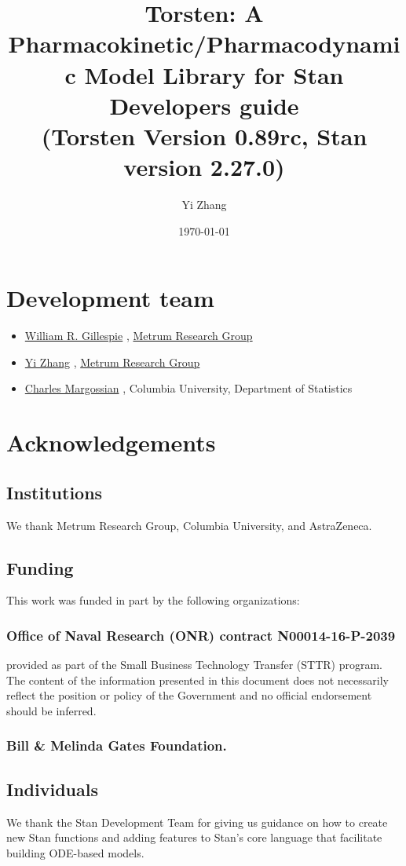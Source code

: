 \documentclass[12pt, reqno, oneside]{amsbook}
\author{Yi Zhang}
\date{\today}
\title{Torsten: A Pharmacokinetic/Pharmacodynamic Model Library for Stan\\\medskip
\large Developers guide \\  (Torsten Version 0.89rc, Stan version 2.27.0)}
\numberwithin{equation}{chapter}
\numberwithin{figure}{chapter}
\numberwithin{table}{chapter}
\theoremstyle{remark}
\begin{document}
\maketitle
\tableofcontents


\chapter*{Development team}
\label{sec:orge12504c}
\begin{itemize}
\item \href{mailto:billg@metrumrg.com}{William R. Gillespie} , \href{https://www.metrumrg.com/}{Metrum Research Group}
\item \href{mailto:yiz@metrumrg.com}{Yi Zhang} , \href{https://www.metrumrg.com/}{Metrum Research Group}
\item \href{mailto:charles.margossian@columbia.edu}{Charles Margossian} , Columbia University, Department of Statistics
\end{itemize}
\chapter*{Acknowledgements}
\label{sec:orgbe77a2c}
\section*{Institutions}
\label{sec:org91ecd8e}
We thank Metrum Research Group, Columbia University, and AstraZeneca.
\section*{Funding}
\label{sec:org341191d}
This work was funded in part by the following organizations:
\subsection*{Office of Naval Research (ONR) contract N00014-16-P-2039}
\label{sec:org4e6ff4c}
provided as part of the Small Business Technology Transfer (STTR)
program. The content of the information presented in this document
does not necessarily reflect the position or policy of the
Government and no official endorsement should be inferred.
\subsection*{Bill \& Melinda Gates Foundation.}
\label{sec:org76e5e40}
\section*{Individuals}
\label{sec:orgb90998b}
We thank the Stan Development Team for giving us guidance on how to
create new Stan functions and adding features to Stan's core language
that facilitate building ODE-based models.
\end{document}
